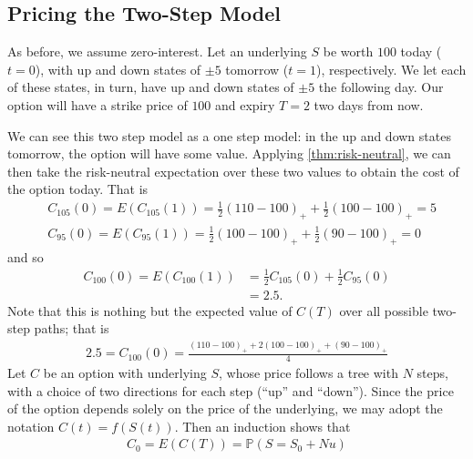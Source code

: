 \documentclass[12pt]{article}
\newcommand{\prob}{\mathbb{P}}
\theoremstyle{plain}
\theoremstyle{definition}
\theoremstyle{remark}
\numberwithin{equation}{section}  %
\begin{document}
\subsection{Pricing the Two-Step Model}
As before, we assume zero-interest. Let an underlying $S$ be worth
$100$ today ($t=0$), with up and down states of $\pm 5$ tomorrow ($t=1$), respectively.  We let each of these states, in turn, have up and down states of
$\pm 5$ the following day. Our option will have a strike price of $100$
and expiry $T = 2$ two days from now. 

We can see this two step model as a one step model: in the up and down states
tomorrow, the option will have some value. Applying 
\cref{thm:risk-neutral}, we can then take the risk-neutral 
expectation over these two values to obtain the cost of the option today.
That is
\begin{equation*}
\begin{split}
& C_{105}(0) = E(C_{105}(1)) = \frac{1}{2}{(110 - 100)}_{+} +
\frac{1}{2}{(100 - 100)}_{+} = 5
\\
& C_{95}(0) = E(C_{95}(1)) = \frac{1}{2}{(100 - 100)}_{+} +
\frac{1}{2}{(90 - 100)}_{+} = 0
\end{split}
\end{equation*}
and so
\begin{equation*}
\begin{split}
C_{100}(0) = E(C_{100}(1))
& = \frac{1}{2}C_{105}(0) + \frac{1}{2} C_{95}(0)
\\
& = 2.5.
\end{split}
\end{equation*}
Note that this is nothing but the expected value
of $C(T)$ over all possible two-step paths; that is
\begin{equation*}
\begin{split}
2.5 = C_{100}(0) = \frac{{(110-100)}_{+} + 2 {(100 - 100)}_{+} + {(90 - 100)}_{+}}{4}
\end{split}
\end{equation*}
Let $C$ be an option with underlying $S$, whose price follows
a tree with $N$ steps, with a choice of two
directions for each step (``up'' and ``down'').
Since the price of the option depends solely on the price of the
underlying, we may adopt the notation $C(t) = f(S(t))$. Then
an induction shows that
\begin{equation*}
\begin{split}
C_{0} = E(C(T)) =  \prob(S = S_{0} + Nu)
\end{split}
\end{equation*}
\end{document}
